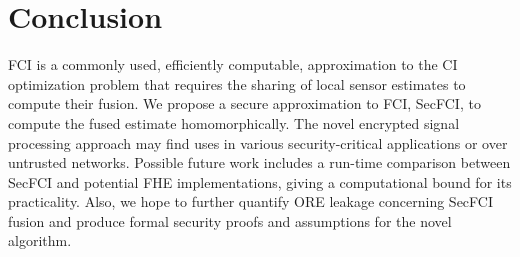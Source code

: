 \documentclass[letterpaper, 10 pt, conference]{ieeeconf}  %
\begin{document}
\section{Conclusion} \label{sec:conclusion}
FCI is a commonly used, efficiently computable, approximation to the CI optimization problem that requires the sharing of local sensor estimates to compute their fusion. We propose a secure approximation to FCI, SecFCI, to compute the fused estimate homomorphically. The novel encrypted signal processing approach may find uses in various security-critical applications or over untrusted networks. Possible future work includes a run-time comparison between SecFCI and potential FHE implementations, giving a computational bound for its practicality. Also, we hope to further quantify ORE leakage concerning SecFCI fusion and produce formal security proofs and assumptions for the novel algorithm.



\end{document}
